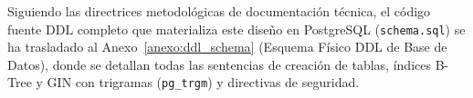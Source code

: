 \noindent Siguiendo las directrices metodológicas de documentación técnica, el código fuente DDL completo que materializa este diseño en PostgreSQL (\texttt{schema.sql}) se ha trasladado al Anexo~\ref{anexo:ddl_schema} (Esquema Físico DDL de Base de Datos), donde se detallan todas las sentencias de creación de tablas, índices B-Tree y GIN con trigramas (\texttt{pg\_trgm}) y directivas de seguridad.
